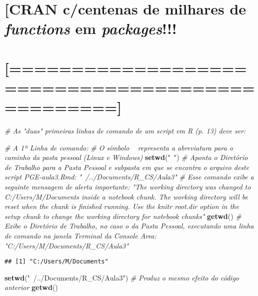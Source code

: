 \documentclass[]{article}
\newenvironment{Shaded}{\begin{snugshade}}{\end{snugshade}}
\newcommand{\KeywordTok}[1]{\textcolor[rgb]{0.13,0.29,0.53}{\textbf{#1}}}
\newcommand{\StringTok}[1]{\textcolor[rgb]{0.31,0.60,0.02}{#1}}
\newcommand{\CommentTok}[1]{\textcolor[rgb]{0.56,0.35,0.01}{\textit{#1}}}
\newcommand{\NormalTok}[1]{#1}
\begin{document}
\section{\texorpdfstring{{[}CRAN c/centenas de milhares de
\emph{functions} em
\emph{packages}!!!}{{[}CRAN c/centenas de milhares de functions em packages!!!}}\label{cran-ccentenas-de-milhares-de-functions-em-packages}

\section{{[}================================================{]}}\label{section-1}

\begin{Shaded}
\begin{Highlighting}[]
\CommentTok{# As "duas" primeiras linhas de comando de um script em R (p. 13) deve ser:}

\CommentTok{# A 1ª Linha de comando:}
\CommentTok{# O símbolo ~ representa a abreviatura para o caminho da pasta pessoal (Linux e Windows)}
\KeywordTok{setwd}\NormalTok{(}\StringTok{"~"}\NormalTok{) }\CommentTok{# Aponta o Diretório de Trabalho para a Pasta Pessoal e subpasta em que se encontra o arquivo deste script PGE-aula3.Rmd: "~/../Documents/R_CS/Aula3"}
\CommentTok{# Esse comando exibe a seguinte mensagem de alerta importante: "The working directory was changed to C:/Users/M/Documents inside a notebook chunk. The working directory will be reset when the chunk is finished running. Use the knitr root.dir option in the setup chunk to change the working directory for notebook chunks"}
\KeywordTok{getwd}\NormalTok{()    }\CommentTok{# Exibe  o Diretório de Trabalho, no caso o da Pasta Pessoal, executando uma linha de comando na janela Terminal da Console Area: "C:/Users/M/Documents/R_CS/Aula3"}
\end{Highlighting}
\end{Shaded}

\begin{verbatim}
## [1] "C:/Users/M/Documents"
\end{verbatim}

\begin{Shaded}
\begin{Highlighting}[]
\KeywordTok{setwd}\NormalTok{(}\StringTok{"~/../Documents/R_CS/Aula3"}\NormalTok{) }\CommentTok{# Produz o mesmo efeito do código anterior}
\KeywordTok{getwd}\NormalTok{()}
\end{Highlighting}
\end{Shaded}
\end{document}
